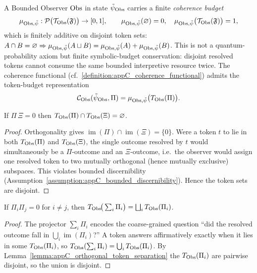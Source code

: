 \begin{definition}
\label{definition:appC_observer_coherence_budget}
A Bounded Observer $\mathrm{Obs}$ in state $\tilde\psi_{\mathrm{Obs}}$ carries a finite
\emph{coherence budget}
\[
\mu_{\mathrm{Obs},\tilde\psi} : \mathcal{P}\big(\mathcal{T}_{\mathrm{Obs}}(\mathfrak{F})\big) \to [0,1],
\qquad
\mu_{\mathrm{Obs},\tilde\psi}(\varnothing) = 0,\quad
\mu_{\mathrm{Obs},\tilde\psi}\big(\mathcal{T}_{\mathrm{Obs}}(\mathfrak{F})\big) = 1,
\]
which is finitely additive on disjoint token sets:
$A \cap B = \varnothing \Rightarrow
\mu_{\mathrm{Obs},\tilde\psi}(A \sqcup B) = \mu_{\mathrm{Obs},\tilde\psi}(A) + \mu_{\mathrm{Obs},\tilde\psi}(B)$.
This is not a quantum-probability axiom but finite symbolic-budget conservation:
disjoint resolved tokens cannot consume the same bounded interpretive resource twice.
The coherence functional (cf.~\ref{definition:appC_coherence_functional}) admits the
token-budget representation
\[
\mathcal{C}_{\mathrm{Obs}}(\tilde\psi_{\mathrm{Obs}}, \Pi) = \mu_{\mathrm{Obs},\tilde\psi}\big(T_{\mathrm{Obs}}(\Pi)\big).
\]
\end{definition}

\begin{lemma}
\label{lemma:appC_orthogonal_token_separation}
If $\Pi\,\Xi = 0$ then $T_{\mathrm{Obs}}(\Pi) \cap T_{\mathrm{Obs}}(\Xi) = \varnothing$.
\end{lemma}

\begin{proof}
\label{proof:appC_orthogonal_token_separation}
Orthogonality gives $\operatorname{im}(\Pi) \cap \operatorname{im}(\Xi) = \{0\}$.
Were a token $t$ to lie in both $T_{\mathrm{Obs}}(\Pi)$ and $T_{\mathrm{Obs}}(\Xi)$, the single outcome
resolved by $t$ would simultaneously be a $\Pi$-outcome and an $\Xi$-outcome,
i.e.\ the observer would assign one resolved token to two mutually orthogonal
(hence mutually exclusive) subspaces. This violates bounded discernibility
(Assumption~\ref{assumption:appC_bounded_discernibility}). Hence the token sets are disjoint.
\end{proof}

\begin{lemma}
\label{lemma:appC_coarse_graining_tokens}
If $\Pi_i \Pi_j = 0$ for $i \neq j$, then
$T_{\mathrm{Obs}}\!\big(\sum_i \Pi_i\big) = \bigsqcup_i T_{\mathrm{Obs}}(\Pi_i)$.
\end{lemma}

\begin{proof}
\label{proof:appC_coarse_graining_tokens}
The projector $\sum_i \Pi_i$ encodes the coarse-grained question
``did the resolved outcome fall in $\bigcup_i \operatorname{im}(\Pi_i)$?'' A token
answers affirmatively exactly when it lies in some $T_{\mathrm{Obs}}(\Pi_i)$, so
$T_{\mathrm{Obs}}(\sum_i \Pi_i) = \bigcup_i T_{\mathrm{Obs}}(\Pi_i)$. By
Lemma~\ref{lemma:appC_orthogonal_token_separation} the $T_{\mathrm{Obs}}(\Pi_i)$ are pairwise
disjoint, so the union is disjoint.
\end{proof}

